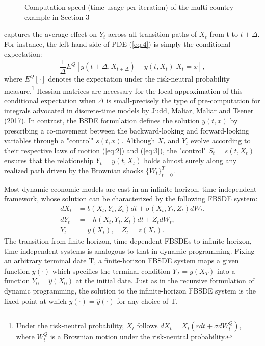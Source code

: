 \documentclass{article}
\begin{document}
\begin{figure}[t]
    \centering
    \caption{Computation speed (time usage per iteration) of the multi-country example in Section 3}
    \label{fig:2}
\end{figure}

captures the average effect on $Y_{t}$ across all transition paths of $X_{t}$ from t to $t+\Delta$. For instance, the left-hand side of PDE (\ref{eq:4}) is simply the conditional expectation:
\[
\frac{1}{\Delta}E^{Q}[y(t+\Delta,X_{t+\Delta})-y(t,X_{t})|X_{t}=x],
\]
where $E^{Q}[\cdot]$ denotes the expectation under the risk-neutral probability measure.\footnote{Under the risk-neutral probability, $X_{t}$ follows $dX_{t}=X_{t}(rdt+\sigma dW_{t}^{Q})$, where $W_{t}^{Q}$ is a Brownian motion under the risk-neutral probability.} Hessian matrices are necessary for the local approximation of this conditional expectation when $\Delta$ is small-precisely the type of pre-computation for integrals advocated in discrete-time models by Judd, Maliar, Maliar and Tsener (2017). In contrast, the BSDE formulation defines the solution $y(t,x)$ by prescribing a co-movement between the backward-looking and forward-looking variables through a "control" $s(t,x)$. Although $X_{t}$ and $Y_{t}$ evolve according to their respective laws of motion (\ref{eq:2}) and (\ref{eq:3}), the "control" $S_{t}=s(t,X_{t})$ ensures that the relationship $Y_{t}=y(t,X_{t})$ holds almost surely along any realized path driven by the Brownian shocks $\{W_{t}\}_{t=0}^{T}.$

Most dynamic economic models are cast in an infinite-horizon, time-independent framework, whose solution can be characterized by the following FBSDE system:
\begin{align*}
dX_{t}&=b(X_{t},Y_{t},Z_{t})dt+\sigma(X_{t},Y_{t},Z_{t})dW_{t}. \\
dY_{t}&=-h(X_{t},Y_{t},Z_{t})dt+Z_{t}dW_{t}, \\
Y_{t}&=y(X_{t}), \quad Z_{t}=z(X_{t}).
\end{align*}
The transition from finite-horizon, time-dependent FBSDEs to infinite-horizon, time-independent systems is analogous to that in dynamic programming. Fixing an arbitrary terminal date T, a finite-horizon FBSDE system maps a given function $y(\cdot)$ which specifies the terminal condition $Y_{T}=y(X_{T})$ into a function $Y_{0}=\hat{y}(X_{0})$ at the initial date. Just as in the recursive formulation of dynamic programming, the solution to the infinite-horizon FBSDE system is the fixed point at which $y(\cdot)=\hat{y}(\cdot)$ for any choice of T.
\end{document}
